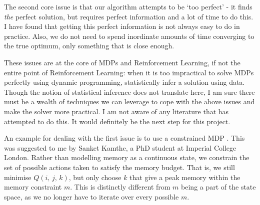 The second core issue is that our algorithm attempts to be `too perfect' - it finds \textit{the} perfect solution, but requires perfect information and a lot of time to do this.
I have found that getting this perfect information is not always easy to do in practice.
Also, we do not need to spend inordinate amounts of time converging to the true optimum, only something that is close enough.

These issues are at the core of MDPs and Reinforcement Learning, if not the entire point of Reinforcement Learning: when it is too impractical to solve MDPs perfectly using dynamic programming, statistically infer a solution using data.
Though the notion of statistical inference does not translate here, I am sure there must be a wealth of techniques we can leverage to cope with the above issues and make the solver more practical.
I am not aware of any literature that has attempted to do this.
It would definitely be the next step for this project.

An example for dealing with the first issue is to use a constrained MDP \cite{Altman1999-constrained-mdps}.
This was suggested to me by Sanket Kamthe, a PhD student at Imperial College London.
Rather than modelling memory as a continuous state, we constrain the set of possible actions taken to satisfy the memory budget.
That is, we still minimise \(Q(i,\,j,\,k)\), but only choose \(k\) that give a peak memory within the memory constraint \(m\).
This is distinctly different from \(m\) being a part of the state space, as we no longer have to iterate over every possible \(m\).
